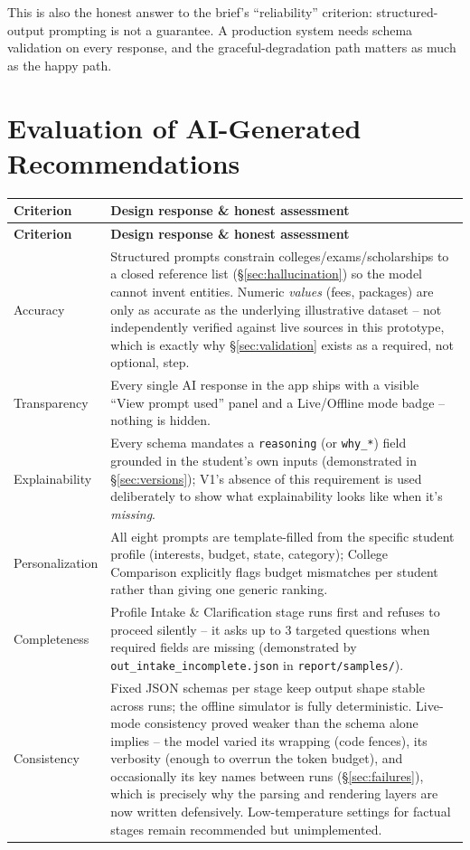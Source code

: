 \documentclass[11pt]{article}
\begin{document}
\noindent This is also the honest answer to the brief's ``reliability'' criterion: structured-output prompting is not a guarantee. A production system needs schema validation on every response, and the graceful-degradation path matters as much as the happy path.

\section{Evaluation of AI-Generated Recommendations}
\label{sec:eval}

\begin{longtable}{|p{2.6cm}|p{11cm}|}
\toprule
\textbf{Criterion} & \textbf{Design response \& honest assessment} \\
\midrule
\endfirsthead
\toprule
\textbf{Criterion} & \textbf{Design response \& honest assessment} \\
\midrule
\endhead
\bottomrule
\endlastfoot
Accuracy & Structured prompts constrain colleges/exams/scholarships to a closed reference list (\S\ref{sec:hallucination}) so the model cannot invent entities. Numeric \emph{values} (fees, packages) are only as accurate as the underlying illustrative dataset -- not independently verified against live sources in this prototype, which is exactly why \S\ref{sec:validation} exists as a required, not optional, step. \\
Transparency & Every single AI response in the app ships with a visible ``View prompt used'' panel and a Live/Offline mode badge -- nothing is hidden. \\
Explainability & Every schema mandates a \texttt{reasoning} (or \texttt{why\_*}) field grounded in the student's own inputs (demonstrated in \S\ref{sec:versions}); V1's absence of this requirement is used deliberately to show what explainability looks like when it's \emph{missing}. \\
Personalization & All eight prompts are template-filled from the specific student profile (interests, budget, state, category); College Comparison explicitly flags budget mismatches per student rather than giving one generic ranking. \\
Completeness & Profile Intake \& Clarification stage runs first and refuses to proceed silently -- it asks up to 3 targeted questions when required fields are missing (demonstrated by \texttt{out\_intake\_incomplete.json} in \texttt{report/samples/}). \\
Consistency & Fixed JSON schemas per stage keep output shape stable across runs; the offline simulator is fully deterministic. Live-mode consistency proved weaker than the schema alone implies -- the model varied its wrapping (code fences), its verbosity (enough to overrun the token budget), and occasionally its key names between runs (\S\ref{sec:failures}), which is precisely why the parsing and rendering layers are now written defensively. Low-temperature settings for factual stages remain recommended but unimplemented. \\

\end{longtable}
\end{document}
